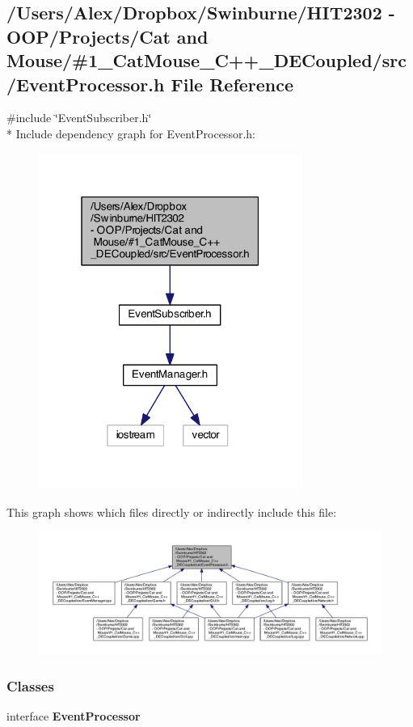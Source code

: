 \subsection{/\-Users/\-Alex/\-Dropbox/\-Swinburne/\-H\-I\-T2302 -\/ O\-O\-P/\-Projects/\-Cat and Mouse/\#1\-\_\-\-Cat\-Mouse\-\_\-\-C++\-\_\-\-D\-E\-Coupled/src/\-Event\-Processor.h File Reference}
\label{_event_processor_8h}
{\ttfamily \#include \char`\"{}Event\-Subscriber.\-h\char`\"{}}\\*
Include dependency graph for Event\-Processor.\-h\-:
\nopagebreak
\begin{figure}[H]
\begin{center}
\leavevmode
\includegraphics[width=244pt]{_event_processor_8h__incl}
\end{center}
\end{figure}
This graph shows which files directly or indirectly include this file\-:
\nopagebreak
\begin{figure}[H]
\begin{center}
\leavevmode
\includegraphics[width=350pt]{_event_processor_8h__dep__incl}
\end{center}
\end{figure}
\subsubsection*{Classes}
\begin{DoxyCompactItemize}
\item 
interface {\bf Event\-Processor}
\end{DoxyCompactItemize}
